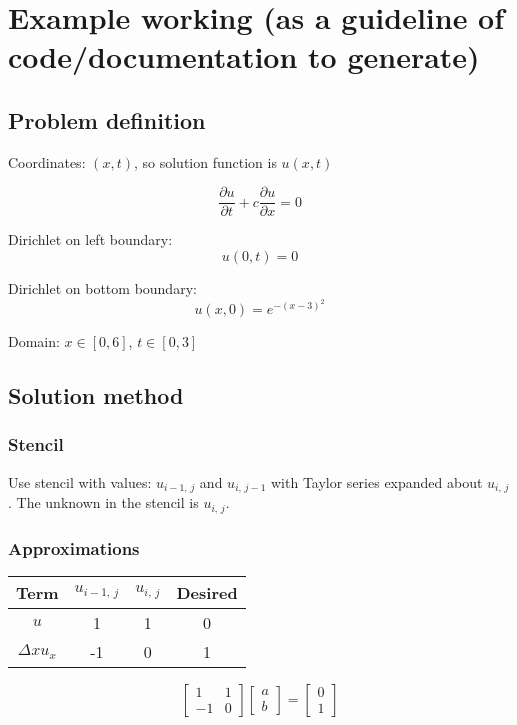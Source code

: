 \documentclass[a4paper]{article}
\begin{document}
\newcommand{\diff}[2]{\frac{\partial#1}{\partial#2}}

\section{Example working (as a guideline of code/documentation to generate)}

\subsection{Problem definition}

Coordinates: $(x, t)$, so solution function is $u(x, t)$

$$ \frac{\partial u}{\partial t} + c \frac{\partial u}{\partial x} = 0 $$

Dirichlet on left boundary: 
$$u(0, t) = 0$$

Dirichlet on bottom boundary: 
$$u(x, 0) = e^{-(x-3)^2}$$

Domain: $x \in [0, 6]$, $t \in [0, 3]$


\subsection{Solution method}

\subsubsection{Stencil}
Use stencil with values: $u_{i-1, \,j}$ and $u_{i, \,j-1}$ with Taylor series expanded about $u_{i, \,j}$. The unknown in the stencil is $u_{i, \,j}$.

\subsubsection{Approximations}

\begin{table}[htp]
    \centering
    \begin{tabular}{c|c|c|c}
        Term & $u_{i-1,\,j}$ & $u_{i,\,j}$ & Desired \\
        \hline
        $u$ & 1 & 1 & 0 \\
        $\Delta x u_x$ & -1 & 0 & 1 \\
    \end{tabular}
\end{table}

$$ \left[\begin{matrix}
    1 & 1 \\ -1 & 0
\end{matrix}\right]\left[\begin{matrix}
    a \\ b
\end{matrix}\right] = \left[\begin{matrix}
    0 \\ 1
\end{matrix}\right] $$
\end{document}
